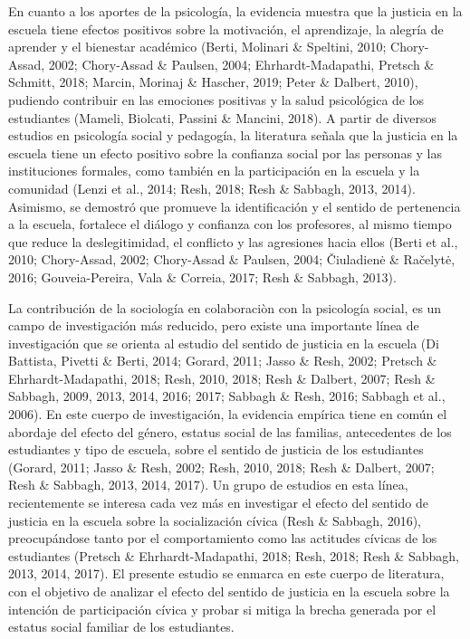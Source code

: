 \documentclass[12pt,twoside]{templates/facsothesis}
\begin{document}
En cuanto a los aportes de la psicología, la evidencia muestra que la justicia en la escuela tiene efectos positivos sobre la motivación, el aprendizaje, la alegría de aprender y el bienestar académico (Berti, Molinari \& Speltini, 2010; Chory-Assad, 2002; Chory-Assad \& Paulsen, 2004; Ehrhardt-Madapathi, Pretsch \& Schmitt, 2018; Marcin, Morinaj \& Hascher, 2019; Peter \& Dalbert, 2010), pudiendo contribuir en las emociones positivas y la salud psicológica de los estudiantes (Mameli, Biolcati, Passini \& Mancini, 2018). A partir de diversos estudios en psicología social y pedagogía, la literatura señala que la justicia en la escuela tiene un efecto positivo sobre la confianza social por las personas y las instituciones formales, como también en la participación en la escuela y la comunidad (Lenzi et al., 2014; Resh, 2018; Resh \& Sabbagh, 2013, 2014). Asimismo, se demostró que promueve la identificación y el sentido de pertenencia a la escuela, fortalece el diálogo y confianza con los profesores, al mismo tiempo que reduce la deslegitimidad, el conflicto y las agresiones hacia ellos (Berti et al., 2010; Chory-Assad, 2002; Chory-Assad \& Paulsen, 2004; Čiuladienė \& Račelytė, 2016; Gouveia-Pereira, Vala \& Correia, 2017; Resh \& Sabbagh, 2013).

La contribución de la sociología en colaboraciòn con la psicología social, es un campo de investigación más reducido, pero existe una importante línea de investigación que se orienta al estudio del sentido de justicia en la escuela (Di Battista, Pivetti \& Berti, 2014; Gorard, 2011; Jasso \& Resh, 2002; Pretsch \& Ehrhardt-Madapathi, 2018; Resh, 2010, 2018; Resh \& Dalbert, 2007; Resh \& Sabbagh, 2009, 2013, 2014, 2016; 2017; Sabbagh \& Resh, 2016; Sabbagh et al., 2006). En este cuerpo de investigación, la evidencia empírica tiene en común el abordaje del efecto del género, estatus social de las familias, antecedentes de los estudiantes y tipo de escuela, sobre el sentido de justicia de los estudiantes (Gorard, 2011; Jasso \& Resh, 2002; Resh, 2010, 2018; Resh \& Dalbert, 2007; Resh \& Sabbagh, 2013, 2014, 2017). Un grupo de estudios en esta línea, recientemente se interesa cada vez más en investigar el efecto del sentido de justicia en la escuela sobre la socialización cívica (Resh \& Sabbagh, 2016), preocupándose tanto por el comportamiento como las actitudes cívicas de los estudiantes (Pretsch \& Ehrhardt-Madapathi, 2018; Resh, 2018; Resh \& Sabbagh, 2013, 2014, 2017). El presente estudio se enmarca en este cuerpo de literatura, con el objetivo de analizar el efecto del sentido de justicia en la escuela sobre la intención de participación cívica y probar si mitiga la brecha generada por el estatus social familiar de los estudiantes.
\end{document}
